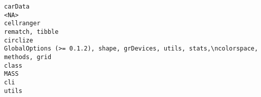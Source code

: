 \documentclass[
  letterpaper,
  DIV=11,
  numbers=noendperiod]{scrreprt}
\begin{document}
\begin{verbatim}
carData                                                                                                                                                                                                                                                                                                                                                                                                                                                                                                                                                                                                               <NA>
cellranger                                                                                                                                                                                                                                                                                                                                                                                                                                                                                                                                                                                                 rematch, tibble
circlize                                                                                                                                                                                                                                                                                                                                                                                                                                                                                                                              GlobalOptions (>= 0.1.2), shape, grDevices, utils, stats,\ncolorspace, methods, grid
class                                                                                                                                                                                                                                                                                                                                                                                                                                                                                                                                                                                                                 MASS
cli                                                                                                                                                                                                                                                                                                                                                                                                                                                                                                                                                                                                                  utils

\end{verbatim}
\end{document}
